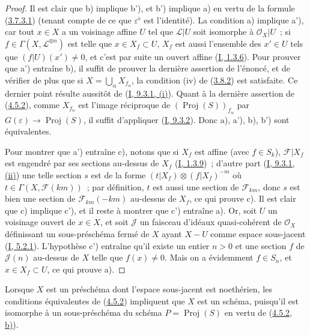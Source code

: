 \begin{proof}
Il est clair que b) implique b'), et b') implique a) en vertu de la formule
(\hyperref[II.3.7.3.1-fr]{3.7.3.1}) (tenant compte de ce que
$\varepsilon^\flat$ est l'identité). La condition a) implique a'), car tout
$x\in X$ a un voisinage affine $U$ tel que
$\mathcal{L}|U$ soit isomorphe à $\mathcal{O}_X|U$~; si
$f\in\Gamma(X,\mathcal{L}^{\otimes n})$ est telle que $x\in X_f\subset U$,
$X_f$ est aussi l'ensemble des $x'\in U$ tels que $(f|U)(x')\neq0$, et c'est
par suite un ouvert affine (\hyperref[I.1.3.6-fr]{I, 1.3.6}). Pour prouver
que a') entraîne b), il suffit de prouver la dernière assertion de l'énoncé,
et de vérifier de plus que si $X=\bigcup_\alpha X_{f_\alpha}$, la condition
(iv) de (\hyperref[II.3.8.2-fr]{3.8.2}) est satisfaite. Ce dernier point
résulte aussitôt de (\hyperref[I.9.3.1-fr]{I, 9.3.1, (i)}). Quant à la
dernière assertion de (\hyperref[II.4.5.2-fr]{4.5.2}), comme
$X_{f_\alpha}$ est l'image réciproque de
$(\operatorname{Proj}(S))_{f_\alpha}$ par
$G(\varepsilon)\to\operatorname{Proj}(S)$, il suffit d'appliquer
(\hyperref[I.9.3.2-fr]{I, 9.3.2}). Donc a), a'), b), b') sont équivalentes.

Pour montrer que a') entraîne c), notons que si $X_f$ est affine (avec
$f\in S_k$), $\mathcal{F}|X_f$ est engendré par ses sections au-dessus de
$X_f$ (\hyperref[I.1.3.9-fr]{I, 1.3.9})~; d'autre part
(\hyperref[I.9.3.1-fr]{I, 9.3.1, (ii)}) une telle section $s$ est de la forme
$(t|X_f)\otimes(f|X_f)^{-m}$ où
$t\in\Gamma(X,\mathcal{F}(km))$~; par définition, $t$ est aussi une section
de $\mathcal{F}_{km}$, donc $s$ est bien une section de
$\mathcal{F}_{km}(-km)$ au-dessus de $X_f$, ce qui prouve c). Il est clair
que c) implique c'), et il reste à montrer que c') entraîne a). Or, soit $U$
un voisinage ouvert de $x\in X$, et soit $\mathcal{J}$ un faisceau d'idéaux
quasi-cohérent de $\mathcal{O}_X$ définissant un sous-préschéma fermé de $X$
ayant $X-U$ comme espace sous-jacent
(\hyperref[I.5.2.1-fr]{I, 5.2.1}). L'hypothèse c') entraîne qu'il existe un
entier $n>0$ et une section $f$ de $\mathcal{J}(n)$ au-dessus de $X$ telle
que $f(x)\neq0$. Mais on a évidemment $f\in S_n$, et $x\in X_f\subset U$, ce
qui prouve a).
\end{proof}

Lorsque $X$ est un préschéma dont l'espace sous-jacent est noethérien, les
conditions équivalentes de (\hyperref[II.4.5.2-fr]{4.5.2}) impliquent que
$X$ est un schéma, puisqu'il est isomorphe à un sous-préschéma du schéma
$P=\operatorname{Proj}(S)$ en vertu de
(\hyperref[II.4.5.2-fr]{4.5.2, b)}).


